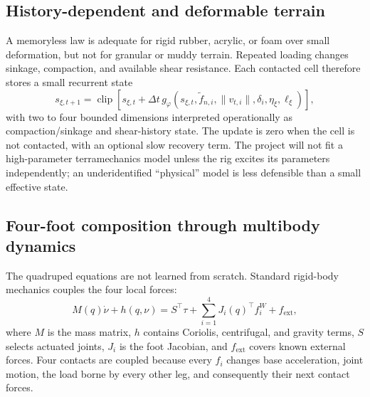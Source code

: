 \subsection{History-dependent and deformable terrain}

A memoryless law is adequate for rigid rubber, acrylic, or foam over small deformation, but not for granular or muddy terrain. Repeated loading changes sinkage, compaction, and available shear resistance. Each contacted cell therefore stores a small recurrent state
\begin{equation}
s_{\xi,t+1}=\operatorname{clip}\left[s_{\xi,t}+\Delta t\,g_\varphi\!\left(s_{\xi,t},\tilde f_{n,i},\lVert v_{t,i}\rVert,\delta_i,\eta_\xi,\ell_\xi\right)\right],
\label{eq:terrain_state}
\end{equation}
with two to four bounded dimensions interpreted operationally as compaction/sinkage and shear-history state. The update is zero when the cell is not contacted, with an optional slow recovery term. The project will not fit a high-parameter terramechanics model unless the rig excites its parameters independently; an underidentified ``physical'' model is less defensible than a small effective state.

\subsection{Four-foot composition through multibody dynamics}

The quadruped equations are not learned from scratch. Standard rigid-body mechanics couples the four local forces:
\begin{equation}
M(q)\dot\nu+h(q,\nu)=S^\top\tau+\sum_{i=1}^{4}J_i(q)^\top f_i^W+f_{\mathrm{ext}},
\label{eq:rigid_body}
\end{equation}
where $M$ is the mass matrix, $h$ contains Coriolis, centrifugal, and gravity terms, $S$ selects actuated joints, $J_i$ is the foot Jacobian, and $f_{\mathrm{ext}}$ covers known external forces. Four contacts are coupled because every $f_i$ changes base acceleration, joint motion, the load borne by every other leg, and consequently their next contact forces.

